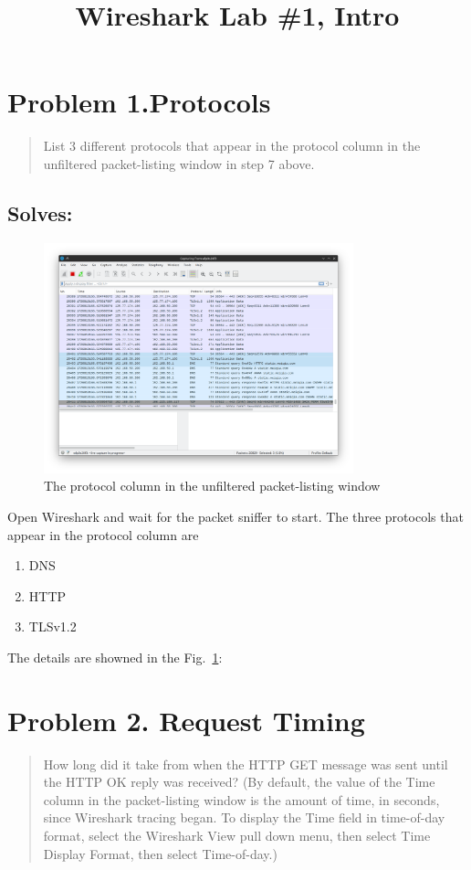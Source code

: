 \documentclass{cshwk}
\begin{document}
\title{Wireshark Lab \#1, Intro}
\maketitle

\section*{Problem 1.Protocols}
\begin{quote}
    List 3 different protocols that appear in the protocol column in the unfiltered packet-listing window in step 7 above.
\end{quote}

\subsection*{Solves:}
\begin{figure}[htbp]
    \centering
    \includegraphics[width=0.8\textwidth]{./lab1-1.png}
    \caption{The protocol column in the unfiltered packet-listing window}
    \label{fig:protocols}
\end{figure}
Open Wireshark and wait for the packet sniffer to start. The three protocols that appear in the protocol column are
\begin{enumerate}
    \item DNS
    \item HTTP
    \item TLSv1.2
\end{enumerate}
The details are showned in the Fig.~\ref{fig:protocols}:

\section*{Problem 2. Request Timing}
\begin{quote}
    How long did it take from when the HTTP GET message was sent until the HTTP OK reply was received? (By default, the value of the Time column in the packet-listing window is the amount of time, in seconds, since Wireshark tracing began. To display the Time field in time-of-day format, select the Wireshark View pull down menu, then select Time Display Format, then select Time-of-day.)
\end{quote}
\end{document}
